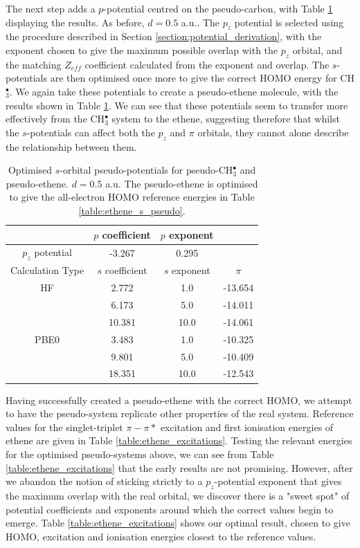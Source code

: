 \documentclass[journal=jctcce,manuscript=article]{achemso}
\begin{document}
The next step adds a \(p\)-potential centred on the pseudo-carbon, with Table \ref{table:p_potentials} displaying the results. As before, \(d = 0.5\) a.u.. The \(p_{z}\) potential is selected using the procedure described in Section \ref{section:potential_derivation}, with the exponent chosen to give the maximum possible overlap with the \(p_{z}\) orbital, and the matching \(Z_{eff}\) coefficient calculated from the exponent and overlap. The \(s\)-potentials are then optimised once more to give the correct HOMO energy for CH\(^{\bullet}_{3}\). We again take these potentials to create a pseudo-ethene molecule, with the results shown in Table \ref{table:p_potentials}. We can see that these potentials seem to transfer more effectively from the CH\(^{\bullet}_{3}\) system to the ethene, suggesting therefore that whilst the \(s\)-potentials can affect both the \(p_{z}\) and \(\pi\) orbitals, they 
cannot alone describe the relationship between them.

\begin{table}[ht]
\caption{Optimised \(s\)-orbital pseudo-potentials for pseudo-CH\(^{\bullet}_{3}\) and pseudo-ethene. \(d = 0.5\) a.u. The pseudo-ethene is optimised to give the all-electron HOMO reference energies in Table \ref{table:ethene_s_pseudo}.}
\begin{tabular}{c c c c}
\hline
& \(p\) coefficient & \(p\) exponent \\
\hline
\(p_{z}\) potential & -3.267 & 0.295 \\
\hline
Calculation Type & \(s\) coefficient & \(s\) exponent & \(\pi\) \\
\hline\hline
HF & 2.772 & 1.0 & -13.654 \\
 & 6.173 & 5.0 & -14.011 \\
 & 10.381 & 10.0 & -14.061 \\
\hline
PBE0 & 3.483 & 1.0 & -10.325 \\
 & 9.801 & 5.0 & -10.409 \\
 & 18.351 & 10.0 & -12.543 \\
\hline
\end{tabular}
\label{table:p_potentials}
\end{table}

Having successfully created a pseudo-ethene with the correct HOMO, we attempt to have the pseudo-system replicate other properties of the real system. Reference values for the singlet-triplet \(\pi-\pi*\) excitation and first ionisation energies of ethene are given in Table \ref{table:ethene_excitations}. Testing the relevant energies for the optimised pseudo-systems above, we can see from Table \ref{table:ethene_excitations} that the early results are not promising. However, after we abandon the notion of sticking strictly to a \(p_{z}\)-potential exponent that gives the maximum overlap with the real orbital, we discover there is a "sweet spot" of potential coefficients and exponents around which the correct values begin to emerge. Table \ref{table:ethene_excitations} shows our optimal result, chosen to give HOMO, excitation and ionisation energies closest to the reference values. 
\end{document}
